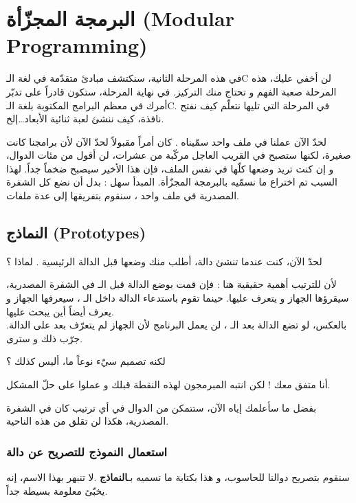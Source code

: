 \chapter{البرمجة المجزّأة (\textenglish{Modular Programming})}

في هذه المرحلة الثانية، سنكتشف مبادئ متقدّمة في لغة الـ\textenglish{C}
 لن أخفي عليك، هذه المرحلة صعبة الفهم و تحتاج منك التركيز. في نهاية المرحلة، ستكون قادراً على تدبّر أمرك في معظم البرامج المكتوبة بلغة الـ\textenglish{C}. 
في المرحلة التي تليها نتعلّم كيف نفتح نافذة، كيف ننشئ لعبة ثنائية الأبعاد\dots إلخ.

لحدّ الآن عملنا في ملف واحد سمّيناه
.
كان أمراً مقبولاً لحدّ الآن لأن برامجنا كانت صغيرة، لكنها ستصبح في القريب العاجل مركّبة من عشرات، لن أقول من مئات الدوال، و إن كنت تريد وضعها كلّها في نفس الملف، فإن هذا الأخير سيصبح ضخماً جداً. لهذا السبب تم اختراع ما نسمّيه بالبرمجة المجزّأة. المبدأ سهل : بدل أن نضع كل الشفرة المصدرية في ملف واحد
، سنقوم بتفريقها إلى عدة ملفات.

\section{النماذج (\textenglish{Prototypes})}

لحدّ الآن، كنت عندما تنشئ دالة، أطلب منك وضعها قبل الدالة الرئيسية
. لماذا ؟

لأن للترتيب أهمية حقيقية هنا : فإن قمت بوضع الدالة قبل الـ
في الشفرة المصدرية، سيقرؤها الجهاز و يتعرف عليها. حينما تقوم باستدعاء الدالة داخل الـ
، سيعرفها الجهاز و يعرف أيضاً أين يبحث عليها.\\
بالعكس، لو تضع الدالة بعد الـ
، لن يعمل البرنامج لأن الجهاز لم يتعرّف بعد على الدالة. جرّب ذلك و سترى.

\begin{question}
  لكنه تصميم سيّء نوعاً ما، أليس كذلك ؟
\end{question}

أنا متفق معك ! لكن انتبه المبرمجون لهذه النقطة قبلك و عملوا على حلّ المشكل.

بفضل ما سأعلمك إياه الآن، ستتمكن من الدوال في أي ترتيب كان في الشفرة المصدرية، هكذا لن تقلق من هذه الناحية.

\subsection{استعمال النموذج للتصريح عن دالة}

سنقوم بتصريح دوالنا للحاسوب، و هذا بكتابة ما نسميه بـ\textbf{النماذج}
.لا تنبهر بهذا الاسم، إنه يخبّئ معلومة بسيطة جداً.

